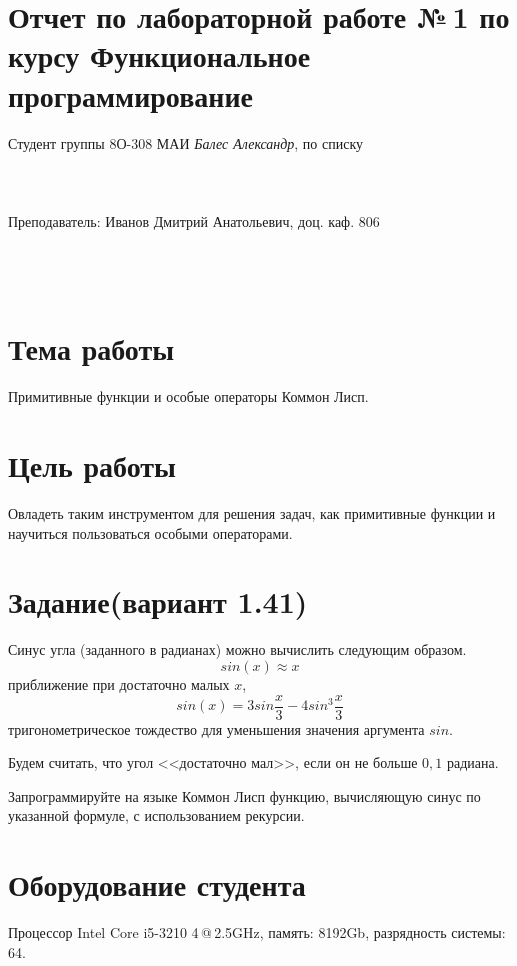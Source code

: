 \documentclass[12pt]{article}
\begin{document}
\section*{Отчет по лабораторной работе №\,1 
по курсу \guillemotleft  Функциональное программирование\guillemotright}
\begin{flushright}
Студент группы 8О-308 МАИ \textit{Балес Александр},  по списку \\
 \\
 \\
\ \\
Преподаватель: Иванов Дмитрий Анатольевич, доц. каф. 806 \\
 \\
 \\
 \\

\end{flushright}

\section{Тема работы}
Примитивные функции и особые операторы Коммон Лисп.

\section{Цель работы}
Овладеть таким инструментом для решения задач, как примитивные функции и научиться пользоваться особыми операторами.

\section{Задание(вариант 1.41)}
Синус угла (заданного в радианах) можно вычислить следующим образом.
$$sin(x)\approx x$$ приближение при достаточно малых $x$, $$sin(x) = 3sin\dfrac{x}{3} - 4sin^3\dfrac{x}{3}$$ тригонометрическое тождество для уменьшения значения аргумента $sin$.

Будем считать, что угол <<достаточно мал>>, если он не больше $0,1$ радиана.

Запрограммируйте на языке Коммон Лисп функцию, вычисляющую синус по указанной формуле, с использованием рекурсии.
\section{Оборудование студента}
Процессор Intel Core i5-3210 4\,@\,2.5GHz, память: 8192Gb, разрядность системы: 64.
\end{document}
